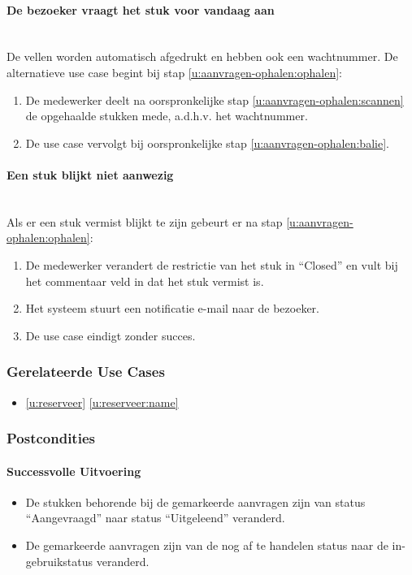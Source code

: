 \documentclass[a4paper,titlepage]{report}
\def\namedref#1{\ref{#1} \ref{#1:name}}
\begin{document}
	      \paragraph{De bezoeker vraagt het stuk voor vandaag aan}\hfill\\
	          De vellen worden automatisch afgedrukt en hebben ook een
	          wachtnummer. De alternatieve use case begint bij stap
	          \ref{u:aanvragen-ophalen:ophalen}:
	          \begin{enumerate}
	            \item De medewerker deelt na oorspronkelijke stap
	              \ref{u:aanvragen-ophalen:scannen} de opgehaalde stukken mede,
	              a.d.h.v.
	              het wachtnummer.
	            \item De use case vervolgt bij oorspronkelijke stap
	              \ref{u:aanvragen-ophalen:balie}.
	          \end{enumerate}
	      \paragraph{Een stuk blijkt niet aanwezig}\hfill\\
	          Als er een stuk vermist blijkt te zijn gebeurt er na stap
	          \ref{u:aanvragen-ophalen:ophalen}:
	          \begin{enumerate}
	            \item De medewerker verandert de restrictie van het stuk in
	              ``Closed'' en vult bij het commentaar veld in dat het stuk
	              vermist is.
	            \item Het systeem stuurt een notificatie e-mail naar de bezoeker.
	            \item De use case eindigt zonder succes.
	          \end{enumerate}
	        
	     
      \subsubsection{Gerelateerde Use Cases}
        \begin{itemize}
          \item \namedref{u:reserveer}
        \end{itemize}
      \subsubsection{Postcondities}
        \paragraph{Successvolle Uitvoering}
        \begin{itemize}
          \item De stukken behorende bij de gemarkeerde aanvragen zijn van
            status ``Aangevraagd'' naar status ``Uitgeleend'' veranderd.
          \item De gemarkeerde aanvragen zijn van de nog af te handelen status
            naar de in-gebruikstatus veranderd.
        \end{itemize}
\end{document}
